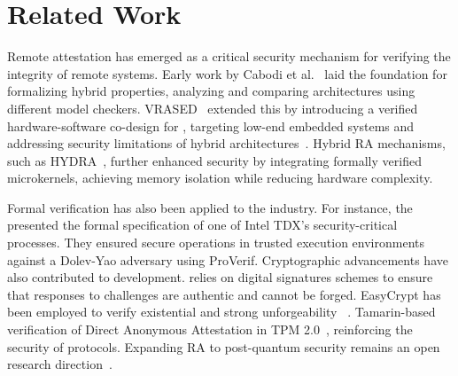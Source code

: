 \section{Related Work}
\label{sec:rel}
%
Remote attestation has emerged as a critical security mechanism for verifying the integrity of remote systems.
%
Early work by Cabodi et al.~\cite{cabodi2015formal, cabodi2016secure} laid the foundation for formalizing hybrid \ra properties, 
analyzing and comparing \ra architectures using different model checkers. 
%
VRASED~\cite{vrased} extended this by introducing 
a verified hardware-software co-design for \ra, targeting low-end embedded systems 
and addressing security limitations of hybrid architectures~\cite{literature, minimalist}.
%
Hybrid RA mechanisms, such as HYDRA~\cite{hydra}, further enhanced security by 
integrating formally verified microkernels, achieving memory isolation while reducing hardware complexity.
%

Formal verification has also been applied to the industry.
%
For instance, the~\cite{sardar2021demystifying} presented the 
formal specification of one of Intel TDX's security-critical processes. 
%
They ensured secure operations in trusted execution environments against a Dolev-Yao adversary using ProVerif. 
%
%
Cryptographic advancements have also contributed to \ra development. 
%
\ra relies on digital signatures schemes to ensure that responses to challenges are authentic and cannot be forged. 
%
EasyCrypt has been employed to verify 
existential and strong unforgeability ~\cite{dupressoir2021machine, cortier2018machine}. 
%
Tamarin-based verification 
of Direct Anonymous Attestation in TPM 2.0~\cite{wesemeyer2020formal}, reinforcing the security of \ra protocols.
%
Expanding RA to post-quantum security remains an open research direction~\cite{pu2023post}.

